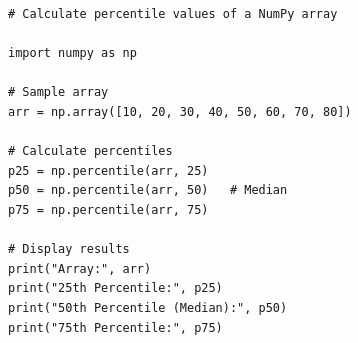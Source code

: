 \begin{verbatim}
# Calculate percentile values of a NumPy array

import numpy as np

# Sample array
arr = np.array([10, 20, 30, 40, 50, 60, 70, 80])

# Calculate percentiles
p25 = np.percentile(arr, 25)
p50 = np.percentile(arr, 50)   # Median
p75 = np.percentile(arr, 75)

# Display results
print("Array:", arr)
print("25th Percentile:", p25)
print("50th Percentile (Median):", p50)
print("75th Percentile:", p75)
\end{verbatim}